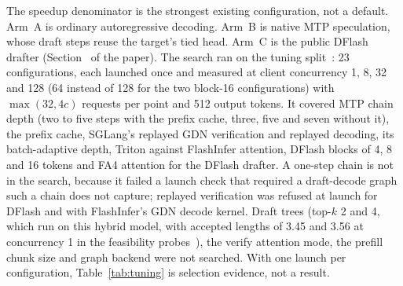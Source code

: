 The speedup denominator is the strongest existing configuration, not a default. Arm~A is ordinary autoregressive decoding. Arm~B is native MTP speculation, whose draft steps reuse the target's tied head. Arm~C is the public DFlash drafter (Section~ of the paper). The search ran on the tuning split~: 23 configurations, each launched once and measured at client concurrency 1, 8, 32 and 128 (64 instead of 128 for the two block-16 configurations) with $\max(32,4c)$ requests per point and 512 output tokens. It covered MTP chain depth (two to five steps with the prefix cache, three, five and seven without it), the prefix cache, SGLang's replayed GDN verification and replayed decoding, its batch-adaptive depth, Triton against FlashInfer attention, DFlash blocks of 4, 8 and 16 tokens and FA4 attention for the DFlash drafter. A one-step chain is not in the search, because it failed a launch check that required a draft-decode graph such a chain does not capture; replayed verification was refused at launch for DFlash and with FlashInfer's GDN decode kernel. Draft trees (top-$k$ 2 and 4, which run on this hybrid model, with accepted lengths of 3.45 and 3.56 at concurrency 1 in the feasibility probes~), the verify attention mode, the prefill chunk size and graph backend were not searched. With one launch per configuration, Table~\ref{tab:tuning} is selection evidence, not a result.

